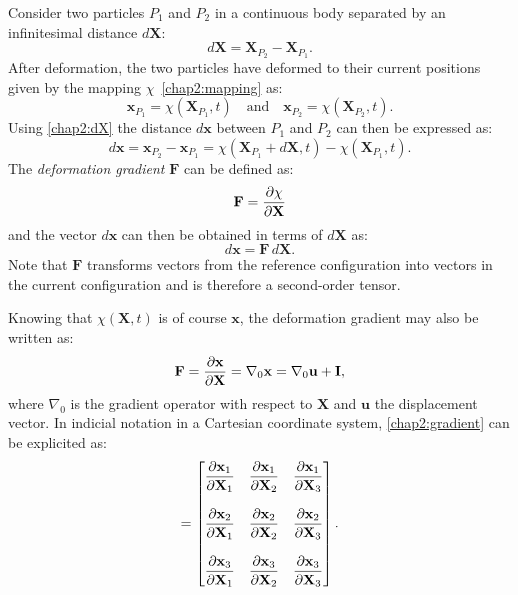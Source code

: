 Consider two particles $P_{1}$ and $P_{2}$ in a continuous body separated by an infinitesimal distance $d\mathbf{X}$:
\begin{equation}
\label{chap2:dX}
d\mathbf{X} = \mathbf{X}_{P_{2}} - \mathbf{X}_{P_{1}}.
\end{equation}
After deformation, the two particles have deformed to their current positions given by the mapping $\chi$~\eqref{chap2:mapping} as:
\begin{equation}
\mathbf{x}_{P_1} = \chi(\mathbf{X}_{P_{1}}, t) \quad \mbox{and} \quad \mathbf{x}_{P_2} = \chi(\mathbf{X}_{P_{2}}, t).
\end{equation}
Using \eqref{chap2:dX} the distance $d\textbf{x}$ between $P_{1}$ and $P_{2}$ can then be expressed as:
\begin{equation}
d\mathbf{x} = \mathbf{x}_{P_{2}} - \mathbf{x}_{P_{1}} = \chi(\mathbf{X}_{P_{1}} + d\mathbf{X}, t) - \chi(\mathbf{X}_{P_{1}}, t).
\end{equation}
The \emph{deformation gradient} $\textbf{F}$ can be defined as:
\begin{equation}
\mathbf{F} = \dfrac{\partial \chi}{\partial \mathbf{X}}
\end{equation}
and the vector $d\textbf{x}$ can then be obtained in terms of $d\mathbf{X}$ as:
\begin{equation}
\label{chap2:dxdX}
d\textbf{x} = \textbf{F} \, d\textbf{X}.
\end{equation}
Note that $\textbf{F}$ transforms vectors from the reference configuration into vectors in the current configuration and is therefore a second-order tensor.

Knowing that $\chi(\mathbf{X}, t)$ is of course $\mathbf{x}$, the deformation gradient may also be written as:
\begin{equation}
\label{chap2:gradient}
\mathbf{F} = \dfrac{\partial \mathbf{x}}{\partial \mathbf{X}} = \nabla_{0} \mathbf{x} = \nabla_{0} \mathbf{u} + \mathbf{I},
\end{equation}
where $\nabla_{0}$ is the gradient operator with respect to $\mathbf{X}$ and $\mathbf{u}$ the displacement vector. In indicial notation in a Cartesian coordinate system, \eqref{chap2:gradient} can be explicited as:
\begin{equation}
[F] = 
	\begin{bmatrix}
		\pd{\mathbf{x}_{1}}{\mathbf{X}_{1}} & \pd{\mathbf{x}_{1}}{\mathbf{X}_{2}} & \pd{\mathbf{x}_{1}}{\mathbf{X}_{3}} \\\\
		\pd{\mathbf{x}_{2}}{\mathbf{X}_{1}} & \pd{\mathbf{x}_{2}}{\mathbf{X}_{2}} & \pd{\mathbf{x}_{2}}{\mathbf{X}_{3}} \\\\
		\pd{\mathbf{x}_{3}}{\mathbf{X}_{1}} & \pd{\mathbf{x}_{3}}{\mathbf{X}_{2}} & \pd{\mathbf{x}_{3}}{\mathbf{X}_{3}}
	\end{bmatrix}
	.
\end{equation}


